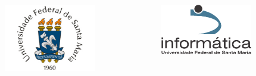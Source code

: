 \documentclass[xcolor=dvipsnames,11pt,presentation,aspectratio=169]{beamer}
\begin{document}
\begin{frame}
  \frametitle{}
  \begin{center}
  \begin{columns}
    \begin{column}{0.5\textwidth}
    \raggedleft
\includegraphics[width=4cm]{logo_ufsm}
    \end{column}
    \begin{column}{0.5\textwidth}
\includegraphics[width=4cm]{logo_inf}
    \end{column}
  \end{columns}
\end{center}

\end{frame}
\end{document}
